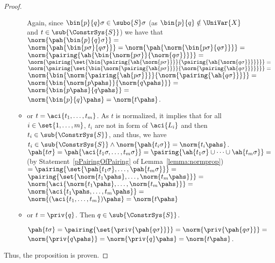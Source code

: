 \begin{prop}
\begin{proof}
\begin{itemize}
\begin{itemize}
		Again, since $\bin{p}{q}\sigma \in \subo{S}\sigma$ (as $\bin{p}{q} \notin \UniVar{X}$ and $t\in \sub{\ConstrSys{S}}$) we have that 
		$\norm{\pah{\bin{p}{q}\sigma}} =  $ \br $ 
		\norm{\pah{\bin{p\sigma}{q\sigma}}}   =  \norm{\pah{\norm{\bin{p\sigma}{q\sigma}}}}  =   $ \br $ 
		\norm{\pairing{\ah{\bin{\norm{p\sigma}}{\norm{q\sigma}}}}}  =   $ \br $ 
		\norm{\pairing{\set{\bin{\pairing{\ah{\norm{p\sigma}}}}{\pairing{\ah{\norm{q\sigma}}}}}}} =  $ \br $ 
		\norm{\pairing{\set{\bin{\norm{\pairing{\ah{p\sigma}}}}{\norm{\pairing{\ah{q\sigma}}}}}}} =  $ \br $ 
		\norm{  \bin{\norm{\pairing{\ah{p\sigma}}}}{\norm{\pairing{\ah{q\sigma}}}}} = $ \br $ 
		\norm{\bin{\norm{p\pahs}}{\norm{q\pahs}}} =  $ \br $ 
		\norm{\bin{p\pahs}{q\pahs}} =  $ \br $ 
		\norm{\bin{p }{q }\pahs}=
		\norm{t\pahs}$.


		\item or $t=\aci{t_1, \dots, t_m}$. As $t$ is normalized, 
		it implies that for all $i\in\set{1,\dots,m}$, $t_i$ are not in form of $\aci{L_{i}}$ and then $t_i \in \sub{\ConstrSys{S}}$, and thus, we have $t_i\in\sub{\ConstrSys{S}} \wedge \norm{\pah{t_i\sigma}} = \norm{t_i\pahs}$. 
		 $\pah{t\sigma}=
		 \pah{\aci{t_1\sigma,\dots,t_m\sigma}}=
		 \pairing{\ah{t_1\sigma} \cup\dots\cup \ah{t_m\sigma}}= $
		 (by Statement~\ref{pPairingOfPairing} of Lemma~\ref{lemma:normprop}) \br
		 $=
\pairing{\set{\pah{t_1\sigma},\dots,\pah{t_m\sigma}}}=  $ \br $ 
		 \pairing{\set{\norm{t_1\pahs},\dots,\norm{t_m\pahs}}}= $ \br $ 
		 \norm{\aci{\norm{t_1\pahs}, \dots, \norm{t_m\pahs}}}= $ \br $ 
		 \norm{\aci{t_1\pahs, \dots, t_m\pahs}}=  $ \br $ 
		 \norm{(\aci{t_1, \dots,t_m})\pahs} = \norm{t\pahs} $


		\item or $t=\priv{q}$. Then $q\in\sub{\ConstrSys{S}}$.
		
		$\pah{t\sigma}=\pairing{\set{\priv{\pah{q\sigma}}}} = \norm{\priv{\pah{q\sigma}}}= $ \br $ \norm{\priv{q\pahs}}=\norm{\priv{q}\pahs}=\norm{t\pahs}$.
		
	\end{itemize}
\end{itemize}

Thus, the proposition is proven.

 \end{proof}

\end{prop}













